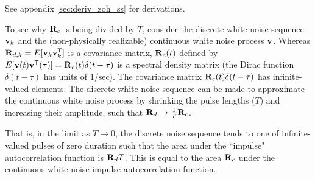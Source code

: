 See appendix \ref{sec:deriv_zoh_ss} for derivations.

To see why $\mathbf{R}_c$ is being divided by $T$, consider the discrete white
noise sequence $\mathbf{v}_k$ and the (non-physically realizable) continuous white
noise process $\mathbf{v}$. Whereas $\mathbf{R}_{d,k} = E[\mathbf{v}_k \mathbf{v}_k^\mathsf{T}]$ is a
covariance matrix, $\mathbf{R}_c(t)$ defined by
$E[\mathbf{v}(t) \mathbf{v}^\mathsf{T}(\tau)] = \mathbf{R}_c(t)\delta(t - \tau)$ is a spectral
density matrix (the Dirac function $\delta(t - \tau)$ has units of
$1/\text{sec}$). The covariance matrix $\mathbf{R}_c(t)\delta(t - \tau)$ has
infinite-valued elements. The discrete white noise sequence can be made to
approximate the continuous white noise process by shrinking the pulse lengths
($T$) and increasing their amplitude, such that
$\mathbf{R}_d \rightarrow \frac{1}{T}\mathbf{R}_c$.

That is, in the limit as $T \rightarrow 0$, the discrete noise sequence tends to
one of infinite-valued pulses of zero duration such that the area under the
``impulse" autocorrelation function is $\mathbf{R}_d T$. This is equal to the area
$\mathbf{R}_c$ under the continuous white noise impulse autocorrelation function.
